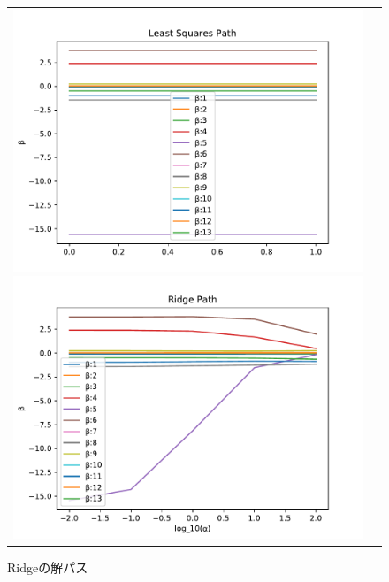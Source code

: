 \documentclass[a4paper,twocolumn]{ujarticle} %
\begin{document}
\begin{figure}[H]
    \begin{tabular}{cc}
    	\begin{minipage}{0.5\hsize}
                	\includegraphics[width=1.0\linewidth]{../img/lrPath.pdf}
                	\caption{最小2乗法の推定値}
               	\label{fig:lr}
    	 \end{minipage}
    	 \begin{minipage}{0.5\hsize}
       		 \includegraphics[width=1.0\linewidth]{../img/ridgePath.pdf}
    		 \caption{Ridgeの解パス}
    		 \label{fig:ridge}
    	 \end{minipage}
	     \end{tabular}
\end{figure}
\end{document}
